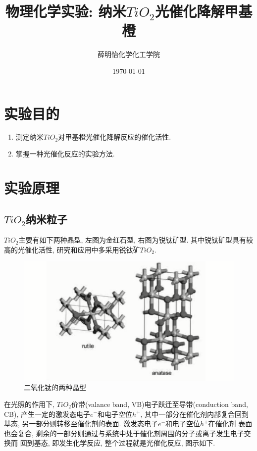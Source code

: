 \documentclass[a4paper]{article}
\title{物理化学实验: 纳米$TiO_{2}$光催化降解甲基橙}
\author{薛明怡\quad 151250177\quad 化学化工学院}
\date{\today}
\begin{document}
\maketitle
\section{实验目的}
\begin{enumerate}
\item 测定纳米$TiO_{2}$对甲基橙光催化降解反应的催化活性.
\item 掌握一种光催化反应的实验方法.
\end{enumerate}
\section{实验原理}
\subsection{$TiO_{2}$纳米粒子}
$TiO_{2}$主要有如下两种晶型, 左图为金红石型, 右图为锐钛矿型. 
其中锐钛矿型具有较高的光催化活性, 研究和应用中多采用锐钛矿$TiO_{2}$.
\begin{figure}[H]
	\centering
	\includegraphics[width = 0.5\paperwidth]{fig/crystalline.png}
	\caption{二氧化钛的两种晶型}
\end{figure}
\par
在光照的作用下, $TiO_{2}$价带(valance band, VB)电子跃迁至导带(conduction band, CB),
产生一定的激发态电子$e^{-}$和电子空位$h^{+}$, 其中一部分在催化剂内部复合回到
基态, 另一部分则转移至催化剂的表面. 激发态电子$e^{-}$和电子空位$h^{+}$在催化剂
表面也会复合, 剩余的一部分则通过与系统中处于催化剂周围的分子或离子发生电子交换而
回到基态, 即发生化学反应, 整个过程就是光催化反应, 图示如下.
\end{document}
